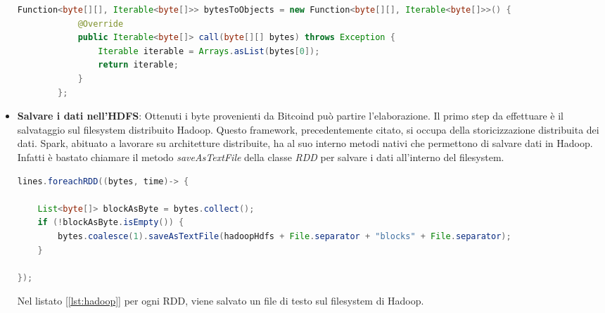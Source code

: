 \begin{itemize}
\begin{lstlisting}[language=Java, label=lst:bytesToObjects, caption={Funzione bytesToObjects.}]
Function<byte[][], Iterable<byte[]>> bytesToObjects = new Function<byte[][], Iterable<byte[]>>() {
            @Override
            public Iterable<byte[]> call(byte[][] bytes) throws Exception {
                Iterable iterable = Arrays.asList(bytes[0]);
                return iterable;
            }
        };
\end{lstlisting}

\item \textbf{Salvare i dati nell'HDFS}: Ottenuti i byte provenienti da Bitcoind può partire l'elaborazione. Il primo step da effettuare è il salvataggio sul filesystem distribuito Hadoop. Questo framework, precedentemente citato, si occupa della storicizzazione distribuita dei dati. Spark, abituato a lavorare su architetture distribuite, ha al suo interno metodi nativi che permettono di salvare dati in Hadoop. Infatti è bastato chiamare il metodo \textit{saveAsTextFile} della classe \textit{RDD} per salvare i dati all'interno del filesystem.

\begin{lstlisting}[language=Java, label=lst:hadoop, caption={Salvataggio Bytes su HDFS.}]
lines.foreachRDD((bytes, time)-> {

	List<byte[]> blockAsByte = bytes.collect();
	if (!blockAsByte.isEmpty()) {
		bytes.coalesce(1).saveAsTextFile(hadoopHdfs + File.separator + "blocks" + File.separator);
	}

});
\end{lstlisting}

Nel listato [\ref{lst:hadoop}] per ogni RDD, viene salvato un file di testo sul filesystem di Hadoop.


\end{itemize}
